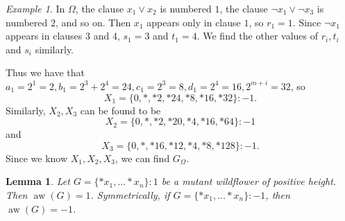 \documentclass{amsart}
\theoremstyle{plain}
\newtheorem{lemma}[thm]{Lemma}
\theoremstyle{definition}
\theoremstyle{remark}
\newtheorem{ex}[thm]{Example}
\numberwithin{equation}{section}
\numberwithin{thm}{section}
\DeclareMathOperator{\aw}{aw}
\begin{document}
\begin{ex}
        In $\Omega$, the clause $x_1 \vee x_2$ is numbered $1$, the clause $\neg x_1 \vee \neg x_3$ is numbered $2$, and so on. Then $x_1$ appears only in clause $1$, so $r_1 = 1$. Since $\neg x_1$ appears in clauses $3$ and $4$, $s_1 = 3$ and $t_1 = 4$. We find the other values of $r_i,t_i$ and $s_i$ similarly.

Thus we have that $a_1 = 2^1 = 2,b_1 =  2^3 + 2^4 = 24,c_1 = 2^3 = 8,d_1 = 2^4 = 16,2^{m+i}=32$, so \begin{equation}
    X_1= \{ 0,*,*2,*24,*8,*16,*32 \}:-1.
\end{equation} 
Similarly, $X_2,X_3$ can be found to be \begin{equation}
    X_2 = \{ 0,*,*2,*20,*4,*16,*64\}:-1
\end{equation}
and \begin{equation}
    X_3 =\{ 0,*,*16,*12,*4,*8,*128 \}:-1.
\end{equation}
Since we know $X_1,X_2,X_3$, we can find $G_{\Omega}$.
\end{ex}
\begin{lemma}
    Let $G = \{*x_1,\ldots *x_n\}:1$ be a mutant wildflower of positive height. Then $\aw(G) = 1$. Symmetrically, if $G = \{*x_1,\ldots *x_n\}:-1$, then $\aw(G) = -1$.
\end{lemma}
\end{document}
